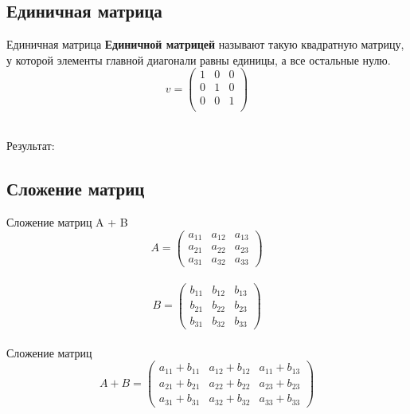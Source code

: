 \documentclass[12pt]{beamer}
\begin{document}
\subsection{Единичная матрица}
\begin{frame}{Единичная матрица}
\textbf{Единичной матрицей} называют такую квадратную матрицу, у которой элементы главной диагонали равны единицы, а все остальные нулю.
\vspace{0.2cm}
\[
  v = 
  \begin{pmatrix}
    1 & 0 & 0 \\
    0 & 1 & 0 \\
    0 & 0 & 1 \\
  \end{pmatrix}
\]
\\
\vspace{-0.6cm}

Результат: \\

\end{frame}


\subsection{Сложение матриц}
\begin{frame}{Сложение матриц A + B}
\[
  A = 
  \begin{pmatrix}
    a_{11} & a_{12} & a_{13}\\
    a_{21} & a_{22} & a_{23}\\
    a_{31} & a_{32} & a_{33}
  \end{pmatrix}
\]
\\
\[
  B = 
  \begin{pmatrix}
    b_{11} & b_{12} & b_{13}\\
    b_{21} & b_{22} & b_{23}\\
    b_{31} & b_{32} & b_{33}
  \end{pmatrix}
\]
\\
Сложение матриц
\\
\[
  A + B = 
  \begin{pmatrix}
    a_{11} + b_{11} & a_{12} + b_{12} & a_{11} + b_{13}\\
    a_{21} + b_{21} & a_{22} + b_{22} & a_{23} + b_{23}\\
    a_{31} + b_{31} & a_{32} + b_{32} & a_{33} + b_{33}
  \end{pmatrix}
\]
\end{frame}
\end{document}
